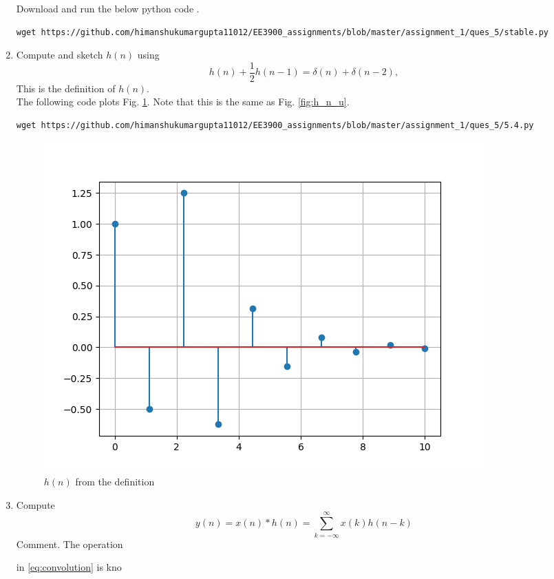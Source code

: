 \documentclass[journal,12pt,twocolumn]{IEEEtran}
\renewcommand\thesection{\arabic{section}}
\begin{document}
\begin{enumerate}[label=\thesection.\arabic*]
\solution Download and run the below python code .
\begin{lstlisting}
wget https://github.com/himanshukumargupta11012/EE3900_assignments/blob/master/assignment_1/ques_5/stable.py
\end{lstlisting}
\item 
Compute and sketch $h(n)$ using 
\begin{equation}
\label{eq:iir_filter_h}
h(n) + \frac{1}{2}h(n-1) = \delta(n) + \delta(n-2), 
\end{equation}
%
This is the definition of $h(n)$.
\\
\solution The following code plots Fig. \ref{fig:h_n_delta}. Note that this is the same as Fig. 
\ref{fig:h_n_u}. 
%
\begin{lstlisting}
wget https://github.com/himanshukumargupta11012/EE3900_assignments/blob/master/assignment_1/ques_5/5.4.py
\end{lstlisting}
\begin{figure}[!ht]
\centering
\includegraphics[width=\columnwidth]{./ques_5/h_delta}
\caption{$h(n)$ from the definition}
\label{fig:h_n_delta}
\end{figure}
%
\item Compute 
%
\begin{equation}
\label{eq:convolution}
y(n) = x(n)*h(n) = \sum_{k=-\infty}^{\infty}x(k)h(n-k)
\end{equation}
%
Comment. The operation 



in \eqref{eq:convolution} is kno





\end{enumerate}
\end{document}
